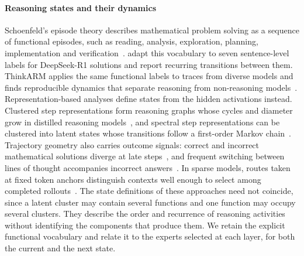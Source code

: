 \paragraph{Reasoning states and their dynamics}
Schoenfeld's episode theory describes mathematical problem solving as a sequence of functional episodes, such as reading, analysis, exploration, planning, implementation and verification~\citep{schoenfeld1985mathematical}.
%
\citet{li2025schoenfeld} adapt this vocabulary to seven sentence-level labels for DeepSeek-R1 solutions and report recurring transitions between them.
%
ThinkARM applies the same functional labels to traces from diverse models and finds reproducible dynamics that separate reasoning from non-reasoning models~\citep{li2026thinkarm}.
%
Representation-based analyses define states from the hidden activations instead.
%
Clustered step representations form reasoning graphs whose cycles and diameter grow in distilled reasoning models~\citep{minegishi2025topology}, and spectral step representations can be clustered into latent states whose transitions follow a first-order Markov chain~\citep{yu2025stateaware}.
%
Trajectory geometry also carries outcome signals: correct and incorrect mathematical solutions diverge at late steps~\citep{sun2026trajectories}, and frequent switching between lines of thought accompanies incorrect answers~\citep{wang2025thoughts}.
%
In sparse models, routes taken at fixed token anchors distinguish contexts well enough to select among completed rollouts~\citep{chen2026same}.
%
The state definitions of these approaches need not coincide, since a latent cluster may contain several functions and one function may occupy several clusters.
%
They describe the order and recurrence of reasoning activities without identifying the components that produce them.
%
We retain the explicit functional vocabulary and relate it to the experts selected at each layer, for both the current and the next state.
%

